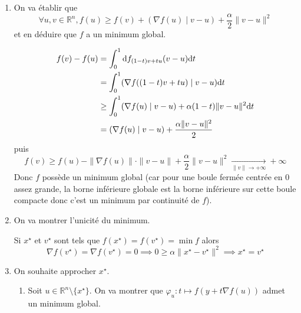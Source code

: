 \begin{enumerate}
    \item On va établir que \[
            \forall u, v\in\mathbb R^n, f(u)\geq f(v)+(\nabla f(u)\;|\;v-u)+\frac\alpha2\|v-u\|^2
        \]
        et en déduire que $f$ a un minimum global.

        \begin{align*}
            f(v)-f(u) &= \int_0^1\mathrm{d} f_{(1-t)v+tu}(v-u)\mathrm{d} t \\
                      &= \int_0^1(\nabla f((1-t)v+tu)\;|\; v-u) \mathrm{d} t \\ 
                      &\geq \int_0^1(\nabla f(u)\;|\;v-u)+\alpha(1-t)\|v-u\|^2\mathrm{d} t \\
                      &=(\nabla f(u)\;|\;v-u)+\frac{\alpha\|v-u\|^2}2
        \end{align*}
        puis \[
            f(v)\geq f(u)-\|\nabla f(u)\|\cdot\|v-u\|+\frac\alpha2\|v-u\|^2\xrightarrow[\|v\|\to+\infty]{}+\infty
        \]
        Donc $f$ possède un minimum global (car pour une boule fermée centrée en $0$ assez grande, la borne inférieure globale est la borne inférieure sur cette boule compacte donc c'est un minimum par continuité de $f$).
    \item On va montrer l'unicité du minimum.

        Si $x^\star$ et $v^\star$ sont tels que $f(x^\star)=f(v^\star)=\min f$ alors \[
            \nabla f(v^\star)=\nabla f(v^\star)=0\implies 0\geq \alpha\|x^\star-v^\star\|^2\implies x^\star=v^\star
        \]
    \item On souhaite approcher $x^\star$.
        \begin{enumerate}
            \item Soit $u\in\mathbb R^n\setminus\{x^\star\}$. On va montrer que $\varphi_u:t\longmapsto f(y+t\nabla f(u))$ admet un minimum global.


\end{enumerate}
\end{enumerate}
